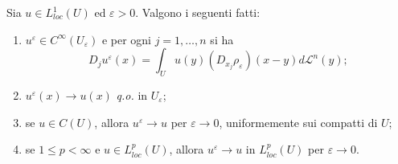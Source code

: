 \begin{proposizione}\label{propmollificatori}
	Sia $u \in L^1_{loc}(U)$ ed $\varepsilon >0$. Valgono i seguenti fatti:
	\begin{enumerate}[$(a)$]
		\item $u^\varepsilon \in C^\infty(U_\varepsilon)$ e per ogni $j =1,\dots,n$ si ha
		\[ D_j u^\varepsilon (x) = \int_{U} u(y)(D_{x_j}\rho_\varepsilon)(x-y)d\mathcal{L}^n(y);\]
		\item $u^\varepsilon(x) \to u(x)$ \emph{q.o.} in $U_\varepsilon$;
		\item se $u \in C(U)$, allora $u^\varepsilon \to u$ per $\varepsilon \to 0$,  uniformemente sui compatti di $U$;
		\item se $1 \le p < \infty$ e $u \in L^p_{loc}(U)$, allora $u^\varepsilon \to u$ in $L^p_{loc}(U)$ per $\varepsilon \to 0$.
	\end{enumerate}
\end{proposizione}
